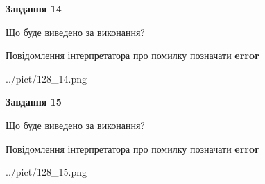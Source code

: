 \documentclass[11pt, ukrainian]{article}
\begin{document}
{\begin {large}
{\begin {center}\textbf{Завдання 14}\end {center}}\par
Що буде виведено за виконання? \par
Повідомлення інтерпретатора про помилку позначати \textbf{error}

\begin{center}
	{../pict/128_14.png}
\end{center}
\newpage

{\begin {center}\textbf{Завдання 15}\end {center}}\par
Що буде виведено за виконання? \par
Повідомлення інтерпретатора про помилку позначати \textbf{error}

\begin{center}
	{../pict/128_15.png}
\end{center}
\newpage

\end {large}}
\end{document}
